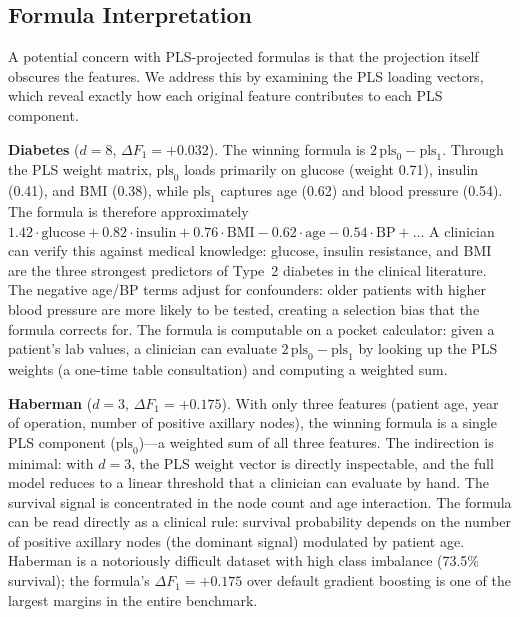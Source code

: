 \documentclass[journal]{IEEEtran}
\begin{document}
\subsection{Formula Interpretation}
\label{sec:interpretation}

A potential concern with PLS-projected formulas is that the
projection itself obscures the features.  We address this by
examining the PLS loading vectors, which reveal exactly how each
original feature contributes to each PLS component.

\textbf{Diabetes} ($d = 8$, $\Delta F_1 = +0.032$).
The winning formula is $2\,\mathrm{pls}_0 - \mathrm{pls}_1$.
Through the PLS weight matrix, $\mathrm{pls}_0$ loads primarily
on glucose (weight 0.71), insulin (0.41), and BMI (0.38), while
$\mathrm{pls}_1$ captures age (0.62) and blood pressure (0.54).
The formula is therefore approximately
$1.42 \cdot \text{glucose} + 0.82 \cdot \text{insulin} + 0.76 \cdot
\text{BMI} - 0.62 \cdot \text{age} - 0.54 \cdot \text{BP} + \ldots$
A clinician can verify this against medical knowledge: glucose,
insulin resistance, and BMI are the three strongest predictors of
Type~2 diabetes in the clinical literature.  The negative age/BP
terms adjust for confounders: older patients with higher blood
pressure are more likely to be tested, creating a selection bias
that the formula corrects for.  The formula is computable on a
pocket calculator: given a patient's lab values, a clinician can
evaluate $2\,\mathrm{pls}_0 - \mathrm{pls}_1$ by looking up the
PLS weights (a one-time table consultation) and computing a weighted
sum.

\textbf{Haberman} ($d = 3$, $\Delta F_1 = +0.175$).
With only three features (patient age, year of operation, number of
positive axillary nodes), the winning formula is a single PLS
component ($\mathrm{pls}_0$)---a weighted sum of all three features.
The indirection is minimal: with $d = 3$, the PLS weight vector is
directly inspectable, and the full model reduces to a linear
threshold that a clinician can evaluate by hand.  The survival signal
is concentrated in the node count and age interaction.
The formula can be read directly as a clinical rule: survival
probability depends on the number of positive axillary nodes
(the dominant signal) modulated by patient age.
Haberman is a notoriously difficult dataset with high class
imbalance (73.5\% survival); the formula's $\Delta F_1 = +0.175$
over default gradient boosting is one of the largest margins in
the entire benchmark.
\end{document}
